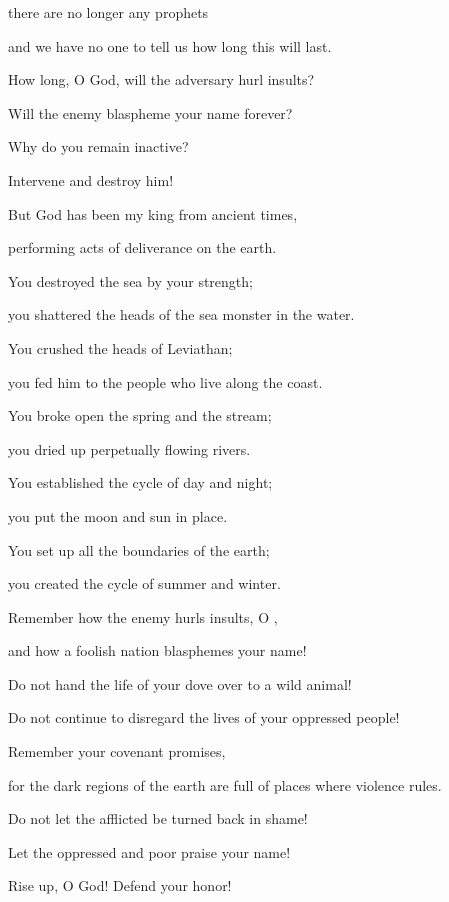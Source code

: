 {\par }{\Q there
are no
longer
any prophets
\par }{\Q and we have no one
to tell
us how
long this will last.
\par }{\Q {}How long,
O God,
will the adversary
hurl insults?
\par }{\Q Will the enemy
blaspheme
your
name
forever?
\par }{\Q {}Why
do you remain inactive?
\par }{\Q Intervene and destroy him!
\par }{\Q {}But God
has been my king
from ancient
times,
\par }{\Q performing
acts of deliverance
on the earth.
\par }{\Q {}You
destroyed
the sea
by your strength;
\par }{\Q you shattered
the heads
of the sea monster
in
the water.
\par }{\Q {}You
crushed
the heads
of Leviathan;
\par }{\Q you fed
him to the people
who live along the coast.
\par }{\Q {}You
broke
open the spring
and the stream;
\par }{\Q you
dried
up perpetually flowing
rivers.
\par }{\Q {}You established
the cycle of day
and night;
\par }{\Q you
put the moon
and sun in place.
\par }{\Q {}You
set
up all
the boundaries
of the earth;
\par }{\Q you
created
the cycle of summer
and winter.
\par }{\Q {}Remember
how the enemy
hurls insults,
O
{},

\par }{\Q and how a foolish
nation
blasphemes your name!
\par }{\Q {}Do not
hand
the life
of your dove
over to a wild animal!
\par }{\Q Do not
continue
to disregard
the lives
of your oppressed people!
\par }{\Q {}Remember
your covenant
promises,

\par }{\Q for
the dark regions
of the earth
are full
of places
where violence rules.
\par }{\Q {}Do not
let the afflicted
be turned back
in shame!
\par }{\Q Let the oppressed
and poor
praise
your name!
\par }{\Q {}Rise
up, O God! Defend
your honor!

}
